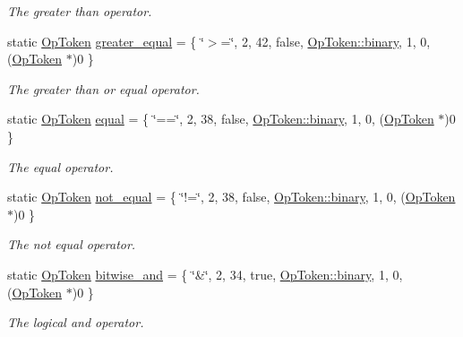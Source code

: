 \begin{DoxyCompactItemize}
\begin{DoxyCompactList}\small\item\em The {\itshape greater} {\itshape than} operator. \end{DoxyCompactList}\item 
static \mbox{\hyperlink{class_op_token}{Op\+Token}} \mbox{\hyperlink{class_print_c_a6fa9b5b5fb7f70d5cd9c5de657a37a42}{greater\+\_\+equal}} = \{ \char`\"{}$>$=\char`\"{}, 2, 42, false, \mbox{\hyperlink{class_op_token_af41c7f108d5662ede7765c5a6c44eaffa3a2ec63522a9329a71ddbe8adc3e752d}{Op\+Token\+::binary}}, 1, 0, (\mbox{\hyperlink{class_op_token}{Op\+Token}} $\ast$)0 \}
\begin{DoxyCompactList}\small\item\em The {\itshape greater} {\itshape than} {\itshape or} {\itshape equal} operator. \end{DoxyCompactList}\item 
static \mbox{\hyperlink{class_op_token}{Op\+Token}} \mbox{\hyperlink{class_print_c_a9c4f177aa95f33e2a9d4c2f35eb9f10e}{equal}} = \{ \char`\"{}==\char`\"{}, 2, 38, false, \mbox{\hyperlink{class_op_token_af41c7f108d5662ede7765c5a6c44eaffa3a2ec63522a9329a71ddbe8adc3e752d}{Op\+Token\+::binary}}, 1, 0, (\mbox{\hyperlink{class_op_token}{Op\+Token}} $\ast$)0 \}
\begin{DoxyCompactList}\small\item\em The {\itshape equal} operator. \end{DoxyCompactList}\item 
static \mbox{\hyperlink{class_op_token}{Op\+Token}} \mbox{\hyperlink{class_print_c_a115f90343fffd0f9bb3645b078fa98f8}{not\+\_\+equal}} = \{ \char`\"{}!=\char`\"{}, 2, 38, false, \mbox{\hyperlink{class_op_token_af41c7f108d5662ede7765c5a6c44eaffa3a2ec63522a9329a71ddbe8adc3e752d}{Op\+Token\+::binary}}, 1, 0, (\mbox{\hyperlink{class_op_token}{Op\+Token}} $\ast$)0 \}
\begin{DoxyCompactList}\small\item\em The {\itshape not} {\itshape equal} operator. \end{DoxyCompactList}\item 
static \mbox{\hyperlink{class_op_token}{Op\+Token}} \mbox{\hyperlink{class_print_c_a86216e1cf58cbe570445e93e3adc64ac}{bitwise\+\_\+and}} = \{ \char`\"{}\&\char`\"{}, 2, 34, true, \mbox{\hyperlink{class_op_token_af41c7f108d5662ede7765c5a6c44eaffa3a2ec63522a9329a71ddbe8adc3e752d}{Op\+Token\+::binary}}, 1, 0, (\mbox{\hyperlink{class_op_token}{Op\+Token}} $\ast$)0 \}
\begin{DoxyCompactList}\small\item\em The {\itshape logical} {\itshape and} operator. \end{DoxyCompactList}\item 

\end{DoxyCompactItemize}
